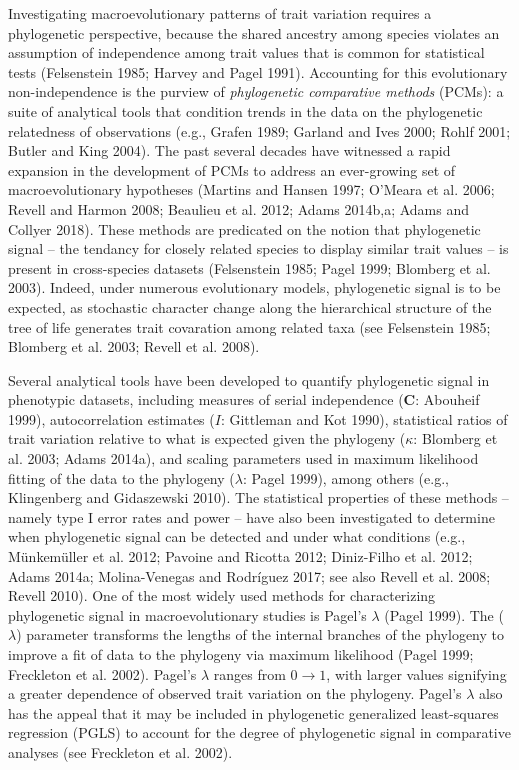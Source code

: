 \documentclass[
]{article}
\begin{document}
Investigating macroevolutionary patterns of trait variation requires a
phylogenetic perspective, because the shared ancestry among species
violates an assumption of independence among trait values that is common
for statistical tests (Felsenstein 1985; Harvey and Pagel 1991).
Accounting for this evolutionary non-independence is the purview of
\emph{phylogenetic comparative methods} (PCMs): a suite of analytical
tools that condition trends in the data on the phylogenetic relatedness
of observations (e.g., Grafen 1989; Garland and Ives 2000; Rohlf 2001;
Butler and King 2004). The past several decades have witnessed a rapid
expansion in the development of PCMs to address an ever-growing set of
macroevolutionary hypotheses (Martins and Hansen 1997; O'Meara et al.
2006; Revell and Harmon 2008; Beaulieu et al. 2012; Adams 2014b,a; Adams
and Collyer 2018). These methods are predicated on the notion that
phylogenetic signal -- the tendancy for closely related species to
display similar trait values -- is present in cross-species datasets
(Felsenstein 1985; Pagel 1999; Blomberg et al. 2003). Indeed, under
numerous evolutionary models, phylogenetic signal is to be expected, as
stochastic character change along the hierarchical structure of the tree
of life generates trait covaration among related taxa (see Felsenstein
1985; Blomberg et al. 2003; Revell et al. 2008). \hfill\break

Several analytical tools have been developed to quantify phylogenetic
signal in phenotypic datasets, including measures of serial independence
(\(\mathbf{C}\): Abouheif 1999), autocorrelation estimates (\(I\):
Gittleman and Kot 1990), statistical ratios of trait variation relative
to what is expected given the phylogeny (\(\kappa\): Blomberg et al.
2003; Adams 2014a), and scaling parameters used in maximum likelihood
fitting of the data to the phylogeny (\(\lambda\): Pagel 1999), among
others (e.g., Klingenberg and Gidaszewski 2010). The statistical
properties of these methods -- namely type I error rates and power --
have also been investigated to determine when phylogenetic signal can be
detected and under what conditions (e.g., Münkemüller et al. 2012;
Pavoine and Ricotta 2012; Diniz-Filho et al. 2012; Adams 2014a;
Molina-Venegas and Rodríguez 2017; see also Revell et al. 2008; Revell
2010). One of the most widely used methods for characterizing
phylogenetic signal in macroevolutionary studies is Pagel's \(\lambda\)
(Pagel 1999). The (\(\lambda\)) parameter transforms the lengths of the
internal branches of the phylogeny to improve a fit of data to the
phylogeny via maximum likelihood (Pagel 1999; Freckleton et al. 2002).
Pagel's \(\lambda\) ranges from \(0\to1\), with larger values signifying
a greater dependence of observed trait variation on the phylogeny.
Pagel's \(\lambda\) also has the appeal that it may be included in
phylogenetic generalized least-squares regression (PGLS) to account for
the degree of phylogenetic signal in comparative analyses (see
Freckleton et al. 2002). \hfill\break 
\end{document}

